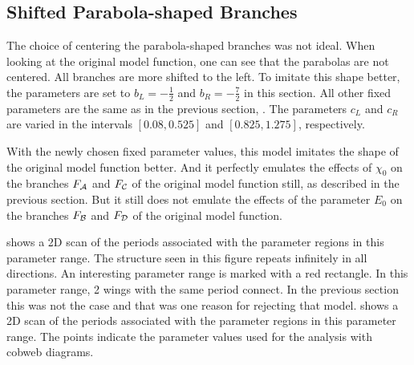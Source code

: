 \subsection{Shifted Parabola-shaped Branches}
\label{sec:setup.quad.skewed}

The choice of centering the parabola-shaped branches was not ideal.
When looking at the original model function, one can see that the parabolas are not centered.
All branches are more shifted to the left.
To imitate this shape better, the parameters are set to $b_L = -\frac{1}{2}$ and $b_R = -\frac{7}{2}$ in this section.
All other fixed parameters are the same as in the previous section, .
The parameters $c_L$ and $c_R$ are varied in the intervals $[0.08, 0.525]$ and $[0.825, 1.275]$, respectively.

With the newly chosen fixed parameter values, this model imitates the shape of the original model function better.
And it perfectly emulates the effects of $\chi_0$ on the branches $F_{\mathcal{A}}$ and $F_{\mathcal{C}}$ of the original model function still, as described in the previous section.
But it still does not emulate the effects of the parameter $E_0$ on the branches $F_{\mathcal{B}}$ and $F_{\mathcal{D}}$ of the original model function.

 shows a 2D scan of the periods associated with the parameter regions in this parameter range.
The structure seen in this figure repeats infinitely in all directions.
An interesting parameter range is marked with a red rectangle.
In this parameter range, 2 wings with the same period connect.
In the previous section this was not the case and that was one reason for rejecting that model.
 shows a 2D scan of the periods associated with the parameter regions in this parameter range.
The points indicate the parameter values used for the analysis with cobweb diagrams.

